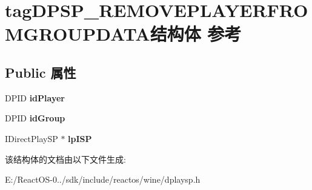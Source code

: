 \hypertarget{structtag_d_p_s_p___r_e_m_o_v_e_p_l_a_y_e_r_f_r_o_m_g_r_o_u_p_d_a_t_a}{}\section{tag\+D\+P\+S\+P\+\_\+\+R\+E\+M\+O\+V\+E\+P\+L\+A\+Y\+E\+R\+F\+R\+O\+M\+G\+R\+O\+U\+P\+D\+A\+T\+A结构体 参考}
\label{structtag_d_p_s_p___r_e_m_o_v_e_p_l_a_y_e_r_f_r_o_m_g_r_o_u_p_d_a_t_a}
\subsection*{Public 属性}
\begin{DoxyCompactItemize}
\item 
\mbox{\label{structtag_d_p_s_p___r_e_m_o_v_e_p_l_a_y_e_r_f_r_o_m_g_r_o_u_p_d_a_t_a_a8ab2831742a60d073b60698565c3c439}} 
D\+P\+ID {\bfseries id\+Player}
\item 
\mbox{\label{structtag_d_p_s_p___r_e_m_o_v_e_p_l_a_y_e_r_f_r_o_m_g_r_o_u_p_d_a_t_a_a0c79ad984869971df97cb108978079f4}} 
D\+P\+ID {\bfseries id\+Group}
\item 
\mbox{\label{structtag_d_p_s_p___r_e_m_o_v_e_p_l_a_y_e_r_f_r_o_m_g_r_o_u_p_d_a_t_a_ab39048f93f523c0b371e85b75ccfddfe}} 
I\+Direct\+Play\+SP $\ast$ {\bfseries lp\+I\+SP}
\end{DoxyCompactItemize}


该结构体的文档由以下文件生成\+:\begin{DoxyCompactItemize}
\item 
E\+:/\+React\+O\+S-\/0../sdk/include/reactos/wine/dplaysp.\+h\end{DoxyCompactItemize}
